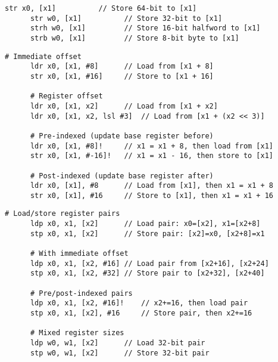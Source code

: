   \begin{definition}
    \begin{lstlisting}[language=arm]
      str x0, [x1]          // Store 64-bit to [x1]
      str w0, [x1]          // Store 32-bit to [x1]
      strh w0, [x1]         // Store 16-bit halfword to [x1]
      strb w0, [x1]         // Store 8-bit byte to [x1]
    \end{lstlisting}
  \end{definition}

  \begin{definition}
    \begin{lstlisting}[language=arm]
      # Immediate offset
      ldr x0, [x1, #8]      // Load from [x1 + 8]
      str x0, [x1, #16]     // Store to [x1 + 16]
      
      # Register offset
      ldr x0, [x1, x2]      // Load from [x1 + x2]
      ldr x0, [x1, x2, lsl #3]  // Load from [x1 + (x2 << 3)]
      
      # Pre-indexed (update base register before)
      ldr x0, [x1, #8]!     // x1 = x1 + 8, then load from [x1]
      str x0, [x1, #-16]!   // x1 = x1 - 16, then store to [x1]
      
      # Post-indexed (update base register after)
      ldr x0, [x1], #8      // Load from [x1], then x1 = x1 + 8
      str x0, [x1], #16     // Store to [x1], then x1 = x1 + 16
    \end{lstlisting}
  \end{definition}

  \begin{definition}
    \begin{lstlisting}[language=arm]
      # Load/store register pairs
      ldp x0, x1, [x2]      // Load pair: x0=[x2], x1=[x2+8]
      stp x0, x1, [x2]      // Store pair: [x2]=x0, [x2+8]=x1
      
      # With immediate offset
      ldp x0, x1, [x2, #16] // Load pair from [x2+16], [x2+24]
      stp x0, x1, [x2, #32] // Store pair to [x2+32], [x2+40]
      
      # Pre/post-indexed pairs
      ldp x0, x1, [x2, #16]!    // x2+=16, then load pair
      stp x0, x1, [x2], #16     // Store pair, then x2+=16
      
      # Mixed register sizes
      ldp w0, w1, [x2]      // Load 32-bit pair
      stp w0, w1, [x2]      // Store 32-bit pair
    \end{lstlisting}
  \end{definition}

